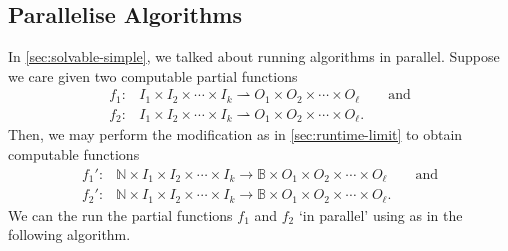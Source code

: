 \documentclass[11pt,a4paper,reqno]{amsart}
\theoremstyle{plain}
\theoremstyle{definition}
\theoremstyle{definition}
\begin{document}
\subsection{Parallelise Algorithms}\label{sec:parallel-algo}

In \cref{sec:solvable-simple}, we talked about running algorithms in parallel.
Suppose we care given two computable partial functions
\begin{align*}
	f_1\colon & I_1\times I_2\times\cdots\times I_k \rightharpoonup O_1 \times O_2 \times\cdots\times O_\ell
	\qquad
	\text{and}
	\\
	f_2\colon & I_1\times I_2\times\cdots\times I_k \rightharpoonup O_1 \times O_2 \times\cdots\times O_\ell.
\end{align*}
Then, we may perform the modification as in \cref{sec:runtime-limit} to obtain computable functions
\begin{align*}
	f_1'\colon & \mathbb N \times I_1\times I_2\times\cdots\times I_k \to \mathbb B \times O_1 \times O_2 \times\cdots\times O_\ell
	\qquad
	\text{and}
	\\
	f_2'\colon & \mathbb N \times I_1\times I_2\times\cdots\times I_k \to \mathbb B\times O_1 \times O_2 \times\cdots\times O_\ell.
\end{align*}
We can the run the partial functions $f_1$ and $f_2$ `in parallel' using as in the following algorithm.


\end{document}
